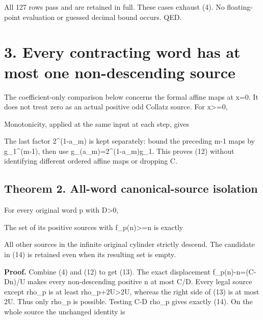 
All 127 rows pass and are retained in full. These cases exhaust (4). No
floating-point evaluation or guessed decimal bound occurs. QED.

\section{3. Every contracting word has at most one non-descending
source}

The coefficient-only comparison below concerns the formal affine maps at
x=0. It does not treat zero as an actual positive odd Collatz source.
For x\textgreater=0,


Monotonicity, applied at the same input at each step, gives


The last factor 2\^{}(1-a\_m) is kept separately: bound the preceding
m-1 maps by g\_1\^{}(m-1), then use g\_(a\_m)=2\^{}(1-a\_m)g\_1. This
proves (12) without identifying different ordered affine maps or
dropping C.

\subsection{Theorem 2. All-word canonical-source isolation}

For every original word p with D\textgreater0,


The set of its positive sources with f\_p(n)\textgreater=n is exactly


All other sources in the infinite original cylinder strictly descend.
The candidate in (14) is retained even when its resulting set is empty.

\textbf{Proof.} Combine (4) and (12) to get (13). The exact displacement
f\_p(n)-n=(C-Dn)/U makes every non-descending positive n at most C/D.
Every legal source except rho\_p is at least rho\_p+2U\textgreater2U,
whereas the right side of (13) is at most 2U. Thus only rho\_p is
possible. Testing C-D rho\_p gives exactly (14). On the whole source the
unchanged identity is

